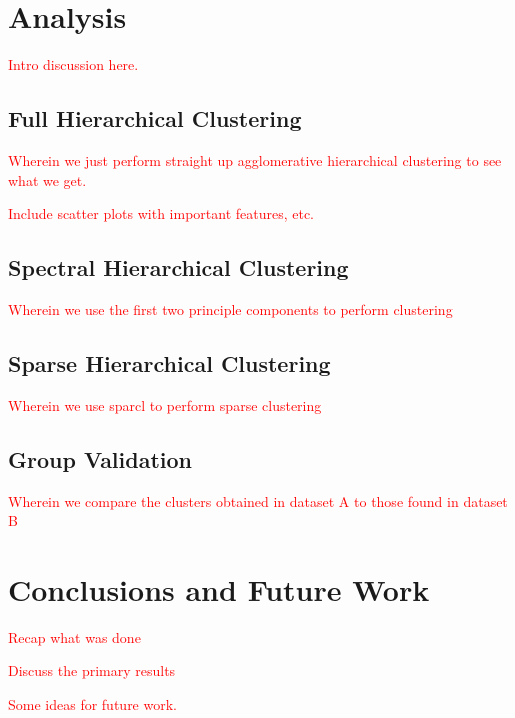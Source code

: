 \documentclass[10pt]{article}
\newcommand{\todo}[1]{\textcolor{red}{#1}}
\begin{document}

  


\section{Analysis}

\todo{Intro discussion here.}

\subsection{Full Hierarchical Clustering}

\todo{Wherein we just perform straight up agglomerative hierarchical clustering to see what we get.}

\todo{Include scatter plots with important features, etc.}

\subsection{Spectral Hierarchical Clustering}

\todo{Wherein we use the first two principle components to perform clustering}

\subsection{Sparse Hierarchical Clustering}

\todo{Wherein we use sparcl to perform sparse clustering}

\subsection{Group Validation}

\todo{Wherein we compare the clusters obtained in dataset A to those found in dataset B}

\section{Conclusions and Future Work}

\todo{Recap what was done}

\todo{Discuss the primary results}

\todo{Some ideas for future work.}


\printbibliography
\end{document}
